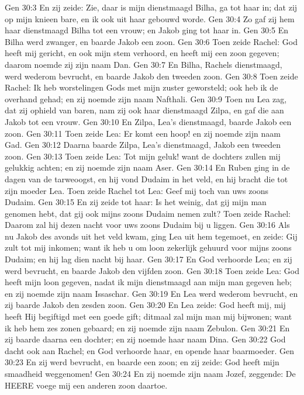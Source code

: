 Gen 30:3  En zij zeide: Zie, daar is mijn dienstmaagd Bilha, ga tot haar in; dat zij op mijn knieen bare, en ik ook uit haar gebouwd worde.
Gen 30:4  Zo gaf zij hem haar dienstmaagd Bilha tot een vrouw; en Jakob ging tot haar in.
Gen 30:5  En Bilha werd zwanger, en baarde Jakob een zoon.
Gen 30:6  Toen zeide Rachel: God heeft mij gericht, en ook mijn stem verhoord, en heeft mij een zoon gegeven; daarom noemde zij zijn naam Dan.
Gen 30:7  En Bilha, Rachels dienstmaagd, werd wederom bevrucht, en baarde Jakob den tweeden zoon.
Gen 30:8  Toen zeide Rachel: Ik heb worstelingen Gods met mijn zuster geworsteld; ook heb ik de overhand gehad; en zij noemde zijn naam Nafthali.
Gen 30:9  Toen nu Lea zag, dat zij ophield van baren, nam zij ook haar dienstmaagd Zilpa, en gaf die aan Jakob tot een vrouw.
Gen 30:10  En Zilpa, Lea's dienstmaagd, baarde Jakob een zoon.
Gen 30:11  Toen zeide Lea: Er komt een hoop! en zij noemde zijn naam Gad.
Gen 30:12  Daarna baarde Zilpa, Lea's dienstmaagd, Jakob een tweeden zoon.
Gen 30:13  Toen zeide Lea: Tot mijn geluk! want de dochters zullen mij gelukkig achten; en zij noemde zijn naam Aser.
Gen 30:14  En Ruben ging in de dagen van de tarweoogst, en hij vond Dudaim in het veld, en hij bracht die tot zijn moeder Lea. Toen zeide Rachel tot Lea: Geef mij toch van uws zoons Dudaim.
Gen 30:15  En zij zeide tot haar: Is het weinig, dat gij mijn man genomen hebt, dat gij ook mijns zoons Dudaim nemen zult? Toen zeide Rachel: Daarom zal hij dezen nacht voor uws zoons Dudaim bij u liggen.
Gen 30:16  Als nu Jakob des avonds uit het veld kwam, ging Lea uit hem tegemoet, en zeide: Gij zult tot mij inkomen; want ik heb u om loon zekerlijk gehuurd voor mijns zoons Dudaim; en hij lag dien nacht bij haar.
Gen 30:17  En God verhoorde Lea; en zij werd bevrucht, en baarde Jakob den vijfden zoon.
Gen 30:18  Toen zeide Lea: God heeft mijn loon gegeven, nadat ik mijn dienstmaagd aan mijn man gegeven heb; en zij noemde zijn naam Issaschar.
Gen 30:19  En Lea werd wederom bevrucht, en zij baarde Jakob den zesden zoon.
Gen 30:20  En Lea zeide: God heeft mij, mij heeft Hij begiftigd met een goede gift; ditmaal zal mijn man mij bijwonen; want ik heb hem zes zonen gebaard; en zij noemde zijn naam Zebulon.
Gen 30:21  En zij baarde daarna een dochter; en zij noemde haar naam Dina.
Gen 30:22  God dacht ook aan Rachel; en God verhoorde haar, en opende haar baarmoeder.
Gen 30:23  En zij werd bevrucht, en baarde een zoon; en zij zeide: God heeft mijn smaadheid weggenomen!
Gen 30:24  En zij noemde zijn naam Jozef, zeggende: De HEERE voege mij een anderen zoon daartoe.
